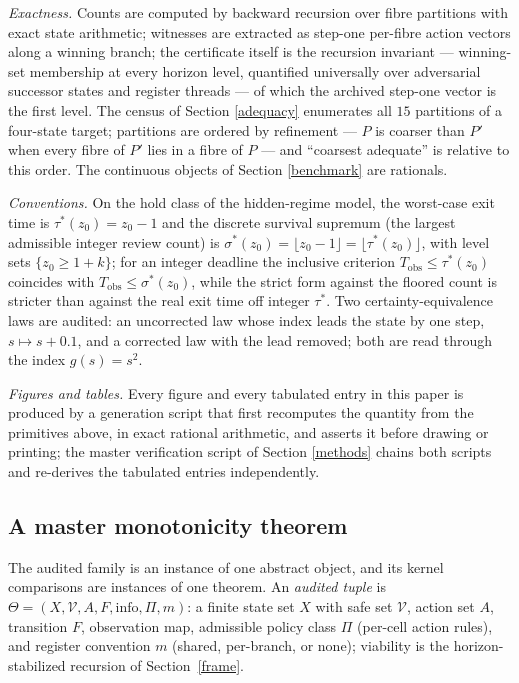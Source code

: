 \documentclass[10pt,twocolumn]{article}
\theoremstyle{definition}
\begin{document}
\emph{Exactness.} Counts are computed by backward recursion over fibre
partitions with exact state arithmetic; witnesses are extracted as step-one per-fibre action vectors along a winning branch; the certificate itself is the recursion invariant --- winning-set membership at every horizon level, quantified universally over adversarial successor states and register threads --- of which the archived step-one vector is the first level. The census of
Section \ref{adequacy} enumerates all \(15\) partitions of a four-state
target; partitions are ordered by refinement --- \(P\) is coarser than
\(P'\) when every fibre of \(P'\) lies in a fibre of \(P\) --- and
``coarsest adequate'' is relative to this order. The continuous objects of Section \ref{benchmark} are rationals.

\emph{Conventions.} On the hold class of the hidden-regime model, the
worst-case exit time is \(\tau^{*}(z_0) = z_0 - 1\) and the discrete
survival supremum (the largest admissible integer review count) is
\(\sigma^{*}(z_0) = \lfloor z_0 - 1 \rfloor = \lfloor \tau^{*}(z_0)
\rfloor\), with level sets \(\{z_0 \ge 1 + k\}\); for an integer deadline
the inclusive criterion \(T_{\mathrm{obs}} \le \tau^{*}(z_0)\) coincides
with \(T_{\mathrm{obs}} \le \sigma^{*}(z_0)\), while the strict form
against the floored count is stricter than against the real exit time off
integer \(\tau^{*}\). Two
certainty-equivalence laws are audited: an uncorrected law whose index
leads the state by one step, \(s \mapsto s + 0.1\), and a corrected law
with the lead removed; both are read through the index \(g(s) = s^{2}\).

\emph{Figures and tables.} Every figure and every tabulated entry in
this paper is produced by a generation script that first recomputes the
quantity from the primitives above, in exact rational arithmetic, and
asserts it before drawing or printing; the master verification script of
Section \ref{methods} chains both scripts and re-derives the tabulated
entries independently.

\subsection{A master monotonicity theorem}\label{mtheorem}

The audited family is an instance of one abstract object, and its
kernel comparisons are instances of one theorem. An \emph{audited
tuple} is
\(\Theta = (X, \mathcal{V}, A, F, \mathrm{info}, \Pi, m)\): a finite
state set \(X\) with safe set \(\mathcal{V}\), action set \(A\),
transition \(F\), observation map, admissible policy class \(\Pi\)
(per-cell action rules), and register convention \(m\) (shared, per-branch,
or none); viability is the horizon-stabilized recursion of
Section~\ref{frame}.
\end{document}
